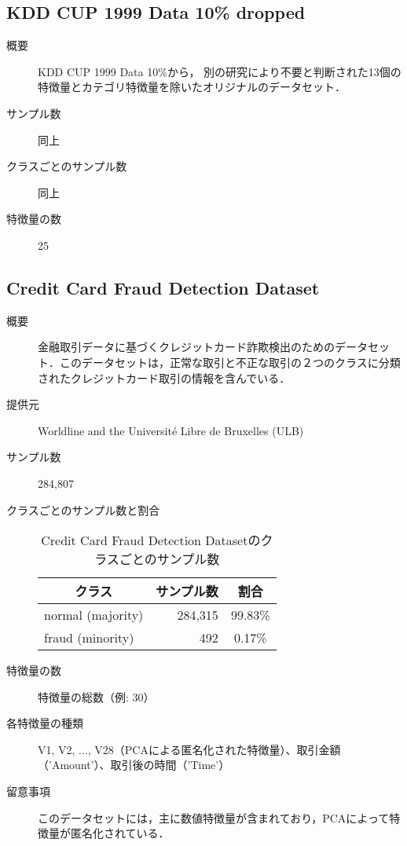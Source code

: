 \subsection{KDD CUP 1999 Data 10\% dropped}
\begin{description}
    \item[概要] KDD CUP 1999 Data 10\%から， 別の研究\cite{thesis1}により不要と判断された13個の特徴量とカテゴリ特徴量を除いたオリジナルのデータセット．
    \item[サンプル数] 同上
    \item[クラスごとのサンプル数] 同上
    \item[特徴量の数] 25 
\end{description}

\subsection{Credit Card Fraud Detection Dataset}
\begin{description}
    \item[概要] 金融取引データに基づくクレジットカード詐欺検出のためのデータセット．このデータセットは，正常な取引と不正な取引の２つのクラスに分類されたクレジットカード取引の情報を含んでいる．
    \item[提供元] Worldline and the Université Libre de Bruxelles (ULB)\cite{CreditCardFraudDetectionDataset}
    \item[サンプル数] 284,807
    \item[クラスごとのサンプル数と割合] \mbox{}
        \begin{table}
            \centering
            \caption{Credit Card Fraud Detection Datasetのクラスごとのサンプル数}
                \label{tab:creditcardfrauddetectiondataset}
                \begin{tabular}{lrc} \hline
                    \multicolumn{1}{c}{クラス}&
                    \multicolumn{1}{c}{サンプル数}&
                    \multicolumn{1}{c}{割合}\\
                    \hline
                    \hline
                    normal  (majority)& 284,315 & 99.83\% \\
                    fraud (minority)& 492 & 0.17\% \\
                    \hline
                \end{tabular}
        \end{table}
    \item[特徴量の数] 特徴量の総数（例: 30）
    \item[各特徴量の種類] \mbox{}
            V1, V2, ..., V28（PCAによる匿名化された特徴量）、取引金額（'Amount'）、取引後の時間（'Time'）
    \item[留意事項] このデータセットには，主に数値特徴量が含まれており，PCAによって特徴量が匿名化されている．
\end{description}

